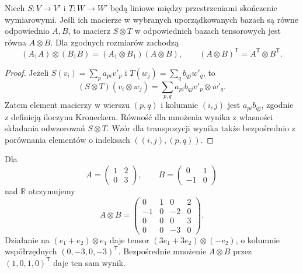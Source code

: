 \begin{twierdzenie}
\label{thm:lin10-macierz-kronecker}
Niech \(S\colon V\to V'\)
i \(T\colon W\to W'\)
będą liniowe między przestrzeniami
skończenie wymiarowymi.
Jeśli ich macierze w
wybranych uporządkowanych bazach
są równe odpowiednio \(A,B\),
to macierz \(S\otimes T\)
w odpowiednich bazach tensorowych
jest równa \(A\otimes B\).
Dla zgodnych rozmiarów zachodzą
\[
 (A_1A)\otimes(B_1B)
 =(A_1\otimes B_1)(A\otimes B),
 \qquad
 (A\otimes B)^{\mathsf T}
 =A^{\mathsf T}\otimes B^{\mathsf T}.
\]
\end{twierdzenie}
\begin{proof}
Jeżeli
\(S(v_i)=\sum_pa_{pi}v'_p\)
i \(T(w_j)=\sum_qb_{qj}w'_q\),
to
\[
 (S\otimes T)(v_i\otimes w_j)
 =\sum_{p,q}a_{pi}b_{qj}
                      v'_p\otimes w'_q.
\]
Zatem element macierzy
w wierszu \((p,q)\) i kolumnie
\((i,j)\) jest \(a_{pi}b_{qj}\),
zgodnie z definicją iloczynu
Kroneckera. Równość dla
mnożenia wynika z własności
składania odwzorowań
\(S\otimes T\).
Wzór dla transpozycji
wynika także bezpośrednio
z porównania elementów
o indeksach \(((i,j),(p,q))\).
\end{proof}

\begin{przyklad}
\label{prz:lin10-kronecker}
Dla
\[
 A=\begin{pmatrix}1&2\\0&3\end{pmatrix},
 \qquad
 B=\begin{pmatrix}0&1\\-1&0\end{pmatrix}
\]
nad \(\mathbb R\) otrzymujemy
\[
 A\otimes B=
 \begin{pmatrix}
 0&1&0&2\\
 -1&0&-2&0\\
 0&0&0&3\\
 0&0&-3&0
 \end{pmatrix}.
\]
Działanie na
\((e_1+e_2)\otimes e_1\)
daje tensor
\((3e_1+3e_2)\otimes(-e_2)\),
o kolumnie współrzędnych
\((0,-3,0,-3)^{\mathsf T}\).
Bezpośrednie mnożenie
\(A\otimes B\) przez
\((1,0,1,0)^{\mathsf T}\)
daje ten sam wynik.
\end{przyklad}

